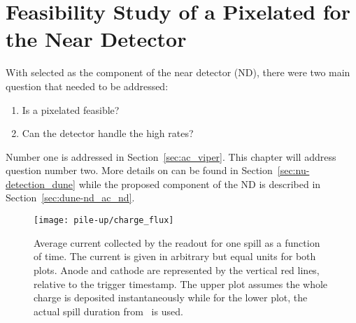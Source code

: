 \section{Feasibility Study of a Pixelated \lartpc{} for the \dune{} Near Detector}
\label{sec:dune-nd_pile-up}

With \AC{} selected as  the \lar{} component of the \dune{} near detector (ND), there were two main question that needed to be addressed:
\begin{enumerate}
	\item Is a pixelated \lartpc{} feasible?
	\item Can the \lar{} detector handle the high rates?
\end{enumerate}
Number one is addressed in Section~\ref{sec:ac_viper}.
This chapter will address question number two.
More details on \dune{} can be found in Section~\ref{sec:nu-detection_dune} while the proposed \AC{} \lar{} component of the ND is described in Section~\ref{sec:dune-nd_ac_nd}.

\begin{figure}[htb]
	\centering
	\texttt{[image: pile-up/charge\_flux]}
	\caption{Average current collected by the readout for one spill as a function of time.
	The current is given in arbitrary but equal units for both plots.
	Anode and cathode are represented by the vertical red lines, relative to the trigger timestamp.
	The upper plot assumes the whole charge is deposited instantaneously while for the lower plot, the actual spill duration from~\cite{dune2} is used.}
	\label{fig:dune-nd_charge-flux}
\end{figure}

